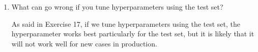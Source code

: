 \documentclass[12pt,reqno]{amsart}
\newif\ifanswer
\begin{document}
\begin{enumerate}[1.]
\item What can go wrong if you tune hyperparameters using the test set?

\ifanswer
{}
As said in Exercise 17, if we tune hyperparameters using the test set, the hyperparameter
works best particularly for the test set, but it is likely that it will not work well for new
cases in production.
\vspace{1cm}






\end{enumerate}
\end{document}
